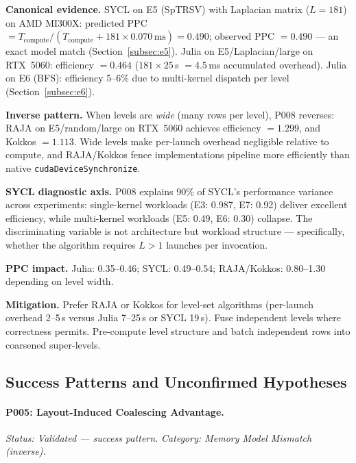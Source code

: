 \noindent\textbf{Canonical evidence.}
SYCL on E5 (SpTRSV) with Laplacian matrix ($L = 181$) on AMD MI300X:
predicted PPC $= T_{\text{compute}} / (T_{\text{compute}} + 181 \times
0.070\,\text{ms}) = 0.490$; observed PPC $= 0.490$ --- an exact model match
(Section~\ref{subsec:e5}). Julia on E5/Laplacian/large on RTX~5060: efficiency
$= 0.464$ ($181 \times 25$\,\textmu{}s $= 4.5$\,ms accumulated overhead).
Julia on E6 (BFS): efficiency 5--6\% due to multi-kernel dispatch per level
(Section~\ref{subsec:e6}).

\noindent\textbf{Inverse pattern.}
When levels are \emph{wide} (many rows per level), P008 reverses: RAJA on
E5/random/large on RTX~5060 achieves efficiency $= 1.299$, and Kokkos
$= 1.113$. Wide levels make per-launch overhead negligible relative to
compute, and RAJA/Kokkos fence implementations pipeline more efficiently
than native \texttt{cudaDeviceSynchronize}.

\noindent\textbf{SYCL diagnostic axis.}
P008 explains 90\% of SYCL's performance variance across experiments:
single-kernel workloads (E3: 0.987, E7: 0.92) deliver excellent efficiency,
while multi-kernel workloads (E5: 0.49, E6: 0.30) collapse. The
discriminating variable is not architecture but workload structure ---
specifically, whether the algorithm requires $L > 1$ launches per invocation.

\noindent\textbf{PPC impact.} Julia: 0.35--0.46; SYCL: 0.49--0.54;
RAJA/Kokkos: 0.80--1.30 depending on level width.

\noindent\textbf{Mitigation.}
Prefer RAJA or Kokkos for level-set algorithms (per-launch overhead 2--5\,\textmu{}s
versus Julia 7--25\,\textmu{}s or SYCL 19\,\textmu{}s). Fuse independent
levels where correctness permits. Pre-compute level structure and batch
independent rows into coarsened super-levels.

\subsection{Success Patterns and Unconfirmed Hypotheses}
\label{subsec:success_patterns}

\paragraph{P005: Layout-Induced Coalescing Advantage.}
\textit{Status: Validated --- success pattern.}
\textit{Category: Memory Model Mismatch (inverse).}

